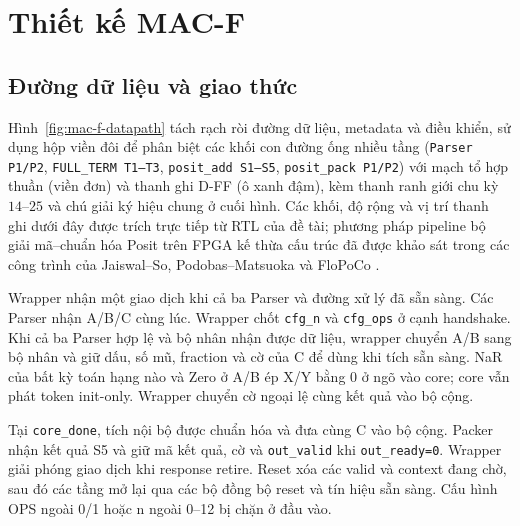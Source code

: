 \chapter{Thiết kế MAC-F}
\label{ch:design}

\section{Đường dữ liệu và giao thức}
Hình~\ref{fig:mac-f-datapath} tách rạch ròi đường dữ liệu, metadata và điều
khiển, sử dụng hộp viền đôi để phân biệt các khối con đường ống nhiều tầng
(\texttt{Parser P1/P2}, \texttt{FULL\_TERM T1--T3}, \texttt{posit\_add S1--S5},
\texttt{posit\_pack P1/P2}) với mạch tổ hợp thuần (viền đơn) và thanh ghi D-FF
(ô xanh đậm), kèm thanh ranh giới chu kỳ $14\text{--}25$ và chú giải ký hiệu
chung ở cuối hình. Các khối, độ rộng và vị trí thanh ghi dưới đây được trích
trực tiếp từ RTL của đề tài; phương pháp pipeline bộ giải mã--chuẩn hóa Posit
trên FPGA kế thừa cấu trúc đã được khảo sát trong các công trình của
Jaiswal--So, Podobas--Matsuoka và FloPoCo \cite{jaiswal2018posit,podobas2018posit,murillo2020flopoco}.

Wrapper nhận một giao dịch khi cả ba Parser và đường xử lý đã sẵn sàng.
Các Parser nhận A/B/C cùng lúc. Wrapper chốt \texttt{cfg\_n} và \texttt{cfg\_ops}
ở cạnh handshake. Khi cả ba Parser hợp lệ và bộ nhân nhận được dữ liệu,
wrapper chuyển A/B sang bộ nhân và giữ dấu, số mũ, fraction và cờ của C
để dùng khi tích sẵn sàng. NaR của bất kỳ toán hạng nào và Zero ở A/B
ép X/Y bằng 0 ở ngõ vào core; core vẫn phát token init-only.
Wrapper chuyển cờ ngoại lệ cùng kết quả vào bộ cộng.

Tại \texttt{core\_done}, tích nội bộ được chuẩn hóa và đưa cùng C vào bộ cộng.
Packer nhận kết quả S5 và giữ mã kết quả, cờ và \texttt{out\_valid} khi
\texttt{out\_ready=0}. Wrapper giải phóng giao dịch khi response retire.
Reset xóa các valid và context đang chờ, sau đó các tầng mở lại qua
các bộ đồng bộ reset và tín hiệu sẵn sàng. Cấu hình OPS ngoài 0/1 hoặc
n ngoài 0--12 bị chặn ở đầu vào.



